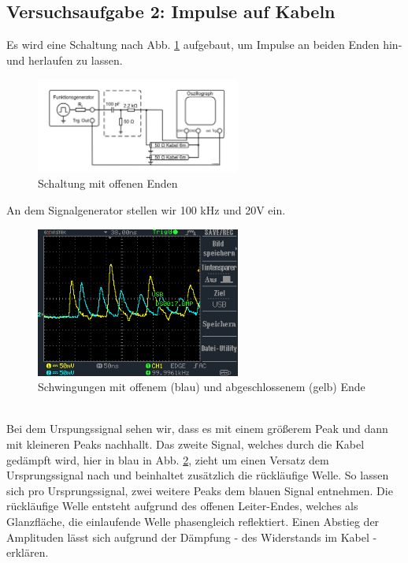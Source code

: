 \documentclass[a4paper,10pt]{article}
\numberwithin{equation}{section}
\begin{document}
\subsection{Versuchsaufgabe 2: Impulse auf Kabeln}
Es wird eine Schaltung nach Abb. \ref{fig:2.1} aufgebaut, um Impulse an beiden Enden hin- und herlaufen zu lassen.
\begin{figure}[h]
        \centering
        \includegraphics[width=0.6\textwidth]{Schaltung_offen.png}
        \caption{Schaltung mit offenen Enden}
		\label{fig:2.1}
\end{figure}
An dem Signalgenerator stellen wir 100 kHz und 20V ein.
\begin{figure}[h]
        \centering
        \includegraphics[width=0.6\textwidth]{data/DS0017.BMP.png}
        \caption{Schwingungen mit offenem (blau) und abgeschlossenem (gelb) Ende}
		\label{fig:2.2}
\end{figure}\\
Bei dem Urspungssignal sehen wir, dass es mit einem größerem Peak und dann mit kleineren Peaks nachhallt. Das zweite Signal, welches durch die Kabel gedämpft wird, hier in blau in Abb. \ref{fig:2.2}, zieht um einen Versatz dem Ursprungssignal nach und beinhaltet zusätzlich die rückläufige Welle. So lassen sich pro Ursprungssignal, zwei weitere Peaks dem blauen Signal entnehmen. Die rückläufige Welle entsteht aufgrund des offenen Leiter-Endes, welches als Glanzfläche, die einlaufende Welle phasengleich reflektiert. Einen Abstieg der Amplituden lässt sich aufgrund der Dämpfung - des Widerstands im Kabel - erklären.
\end{document}
